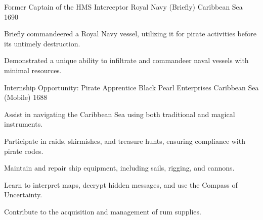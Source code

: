 \begin{cventries}
\cventry
{Former Captain of the HMS Interceptor}
{Royal Navy (Briefly)}
{Caribbean Sea} %
{1690} %
{
\begin{cvitems}
\setlength{\itemsep}{1ex} %
\item {Briefly commandeered a Royal Navy vessel, utilizing it for pirate activities before its untimely destruction.}
\item {Demonstrated a unique ability to infiltrate and commandeer naval vessels with minimal resources.}
%
\end{cvitems}
}

\cventry
{Internship Opportunity: Pirate Apprentice} %
{Black Pearl Enterprises} %
{Caribbean Sea (Mobile)} %
{1688} %
{ %
\begin{cvitems}
\item {Assist in navigating the Caribbean Sea using both traditional and magical instruments.}
\item {Participate in raids, skirmishes, and treasure hunts, ensuring compliance with pirate codes.}
\item {Maintain and repair ship equipment, including sails, rigging, and cannons.}
\item {Learn to interpret maps, decrypt hidden messages, and use the Compass of Uncertainty.}
\item {Contribute to the acquisition and management of rum supplies.}
\end{cvitems}
}


\end{cventries}

